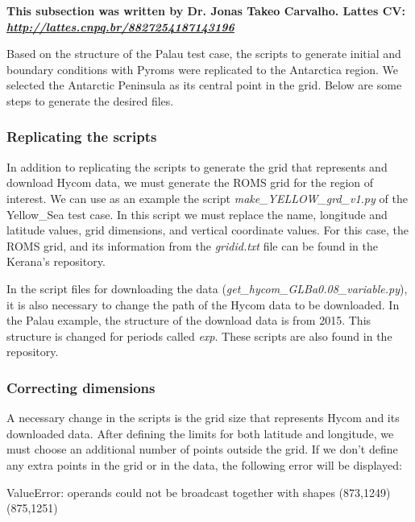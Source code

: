 \noindent \textbf{This subsection was written by Dr. Jonas Takeo Carvalho.  \newline Lattes CV: \textit{\textcolor{bleu_cite}{\href{http://lattes.cnpq.br/8827254187143196}{http://lattes.cnpq.br/8827254187143196}}}} 
\bigskip

\noindent Based on the structure of the Palau test case, the scripts to generate initial and boundary conditions with Pyroms were replicated to the Antarctica region. 
We selected the Antarctic Peninsula as its central point in the grid. Below are some steps to generate the desired files.
\bigskip

\subsubsection{Replicating the scripts}
\bigskip

\noindent In addition to replicating the scripts to generate the grid that represents and download Hycom data, we must generate the ROMS grid for the region of interest.
 We can use as an example the script \textit{make\_YELLOW\_grd\_v1.py} of the Yellow\_Sea test case. In this script we must replace the name, longitude and latitude values, 
 grid dimensions, and vertical coordinate values. For this case, the ROMS grid, and its information from the \textit{gridid.txt} file can be found in the 
 Kerana's repository. 
\bigskip

\noindent In the script files for downloading the data (\textit{get\_hycom\_GLBa0.08\_variable.py}), it is also necessary to change the path of the Hycom data to be 
downloaded. In the Palau example, the structure of the download data is from 2015. This structure is changed for periods called \textit{exp}. These scripts are also 
found in the repository.
\bigskip

\subsubsection{Correcting dimensions}
\bigskip

\noindent A necessary change in the scripts is the grid size that represents Hycom and its downloaded data. After defining the limits for both latitude and longitude,
we must choose an additional number of points outside the grid. If we don't define any extra points in the grid or in the data, the following error will be displayed:
\bigskip

\begin{bashcode}[fontsize=\scriptsize]
ValueError: operands could not be broadcast together with shapes (873,1249) (875,1251)
\end{bashcode}
\bigskip

